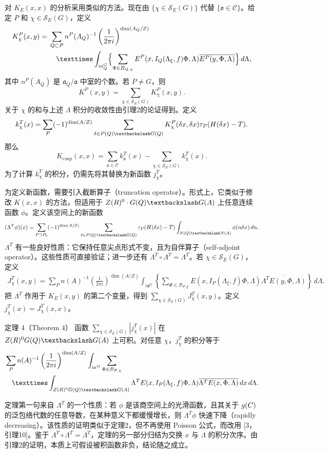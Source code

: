 对 $K_E(x,x)$ 的分析采用类似的方法。现在由 $\{\chi\in\mathcal S_E(G)\}$ 代替
$\{\mathfrak o\in\mathcal C\}$。给定 $P$ 和 $\chi\in\mathcal S_E(G)$，定义
\[
\begin{split}
 K_\chi^P(x,y)={}&\sum_{Q\subset P}n^P(A_Q)^{-1}
 \left(\frac1{2\pi i}\right)^{\dim(A_Q/Z)}\\
 &\quad\times\int_{i\mathfrak a_Q^G}\Bigl\{\sum_{\Phi\in\mathcal B_{Q,\chi}}
 E^P(x,I_Q(\Lambda_\xi,f)\Phi,\Lambda)
 \overline{E^P(y,\Phi,\Lambda)}\Bigr\}\,d\Lambda,
\end{split}
\]
其中 $n^P(A_Q)$ 是 $\mathfrak a_Q/\mathfrak a$ 中室的个数。若 $P\ne G$，则
\[
 K^P(x,y)=\sum_{\chi\in\mathcal S_E(G)}K_\chi^P(x,y).
\]
关于 $\chi$ 的和与上述 $\Lambda$ 积分的收敛性由引理2的论证得到。定义
\[
 k_\chi^T(x)=\sum_P(-1)^{\dim(A/Z)}
 \sum_{\delta\in P(\Q)\backslash G(\Q)}K_\chi^P(\delta x,\delta x)
 \widehat\tau_P(H(\delta x)-T).
\]
那么
\[
 K_{\mathrm{cusp}}(x,x)=\sum_{\mathfrak o\in\mathcal C}k_\mathfrak o^T(x)
 -\sum_{\chi\in\mathcal S_E(G)}k_\chi^T(x).
\]
为了计算 $k_\chi^T$ 的积分，仍需先将其替换为新函数 $j_\chi^T$。

为定义新函数，需要引入截断算子（truncation operator）。形式上，它类似于修改 $K(x,x)$ 的方法，但适用于
$Z(\R)^0\cdot G(\Q)\backslash G(A)$ 上任意连续函数 $\phi$。定义该空间上的新函数
\[
 (\Lambda^T\phi)(x)=\sum_{P\supset P_0}(-1)^{\dim(A/Z)}
 \sum_{\delta\in P(\Q)\backslash G(\Q)}\widehat\tau_P(H(\delta x)-T)
 \int_{N(\Q)\backslash N(A)}\phi(n\delta x)\,dn.
\]
$\Lambda^T$ 有一些良好性质：它保持任意尖点形式不变，且为自伴算子（self-adjoint operator）。这些性质可直接验证；进一步还有
$\Lambda^T\circ\Lambda^T=\Lambda^T$。若 $\chi\in\mathcal S_E(G)$，定义
\[
\begin{split}
 J_\chi^T(x,y)=\sum_Pn(A)^{-1}\left(\frac1{2\pi i}\right)^{\dim(A/Z)}
 \int_{i\mathfrak a^G}\left\{\sum_{\Phi\in\mathcal B_{P,\chi}}
 E(x,I_P(\Lambda_\xi,f)\Phi,\Lambda)
 \overline{\Lambda^TE(y,\Phi,\Lambda)}\right\}\,d\Lambda.
\end{split}
\]
把 $\Lambda^T$ 作用于 $K_E(x,y)$ 的第二个变量，得到
$\sum_{\chi\in\mathcal S_E(G)}J_\chi^T(x,y)$。定义 $j_\chi^T(x)=J_\chi^T(x,x)$。

\begin{originaltheorem}{定理 4（Theorem 4）}
函数 $\sum_{\chi\in\mathcal S_E(G)}|j_\chi^T(x)|$ 在
$Z(\R)^0G(\Q)\backslash G(A)$ 上可积。对任意 $\chi$，$j_\chi^T$ 的积分等于
\[
\begin{split}
 &\sum_Pn(A)^{-1}\left(\frac1{2\pi i}\right)^{\dim(A/Z)}
 \int_{i\mathfrak a^G}\sum_{\Phi\in\mathcal B_{P,\chi}}\\
 &\quad\times\int_{Z(\R)^0G(\Q)\backslash G(A)}
 \Lambda^TE(x,I_P(\Lambda_\xi,f)\Phi,\Lambda)
 \overline{\Lambda^TE(x,\Phi,\Lambda)}\,dx\,d\Lambda.
\end{split}
\]
\end{originaltheorem}
定理第一句来自 $\Lambda^T$ 的一个性质：若 $\phi$ 是该商空间上的光滑函数，且其关于
$g(C)$ 的泛包络代数的任意导数，在某种意义下都缓慢增长，则 $\Lambda^T\phi$ 快速下降（rapidly decreasing）。该性质的证明类似于定理2，但不再使用 Poisson 公式，而改用 [3，引理10]。鉴于 $\Lambda^T\circ\Lambda^T=\Lambda^T$，定理的另一部分归结为交换 $x$ 与 $\Lambda$ 的积分次序。由引理2的证明，本质上可假设被积函数非负，结论随之成立。

